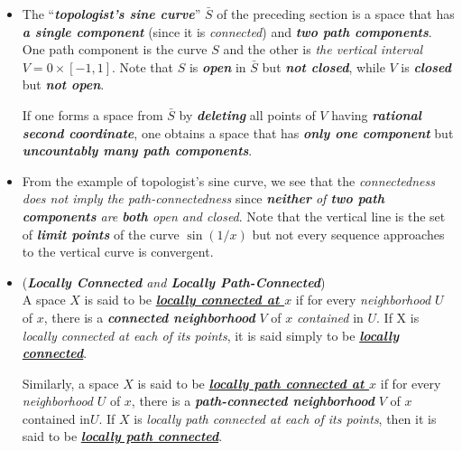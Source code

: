 \documentclass[11pt]{article}
\begin{document}
\begin{itemize}
\item \begin{example}
The ``\emph{\textbf{topologist’s sine curve}}” $\bar{S}$ of the preceding section is a space that has \emph{\textbf{a single component}} (since it is \emph{connected}) and \emph{\textbf{two path components}}. One path component is the curve $S$ and the other is \emph{the vertical interval} $V = 0 \times [-1, 1]$. Note that $S$ is \emph{\textbf{open}} in $\bar{S}$ but \emph{\textbf{not closed}}, while $V$ is \emph{\textbf{closed}} but \emph{\textbf{not open}}.

If one forms a space from $\bar{S}$ by \emph{\textbf{deleting}} all points of $V$ having \emph{\textbf{rational second coordinate}}, one obtains a space that has \emph{\textbf{only one component}} but \emph{\textbf{uncountably many path components}}.
\end{example}

\item \begin{remark}
From the example of topologist's sine curve, we see that the \emph{connectedness does not imply the path-connectedness} since \emph{\textbf{neither} of \textbf{two path components} are \textbf{both} open and closed}. Note that the vertical line is the set of \emph{\textbf{limit points}} of the  curve $\sin(1/x)$ but not every sequence approaches to the vertical curve is convergent. 
\end{remark}

\item \begin{definition} (\emph{\textbf{Locally Connected} and \textbf{Locally Path-Connected}})\\
A space $X$ is said to be  \emph{\underline{\textbf{locally connected at $x$}}} if for every \emph{neighborhood} $U$ of $x$, there is a \emph{\textbf{connected neighborhood}} $V$ of $x$ \emph{contained} in $U$. If X is \emph{locally connected at each of its points}, it is said simply to be  \emph{\underline{\textbf{locally connected}}}. 

Similarly, a space $X$ is said to be \emph{\underline{\textbf{locally path connected at $x$}}} if for every \emph{neighborhood} $U$ of $x$, there is a \emph{\textbf{path-connected neighborhood}} $V$ of $x$ contained in$ U$. If $X$ is \emph{locally path connected at each of its points}, then it is said to be \emph{\underline{\textbf{locally path connected}}}.
\end{definition}



\end{itemize}
\end{document}
